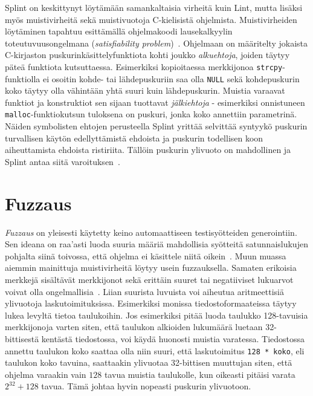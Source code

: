 Splint on keskittynyt löytämään samankaltaisia virheitä kuin Lint,
mutta lisäksi myös muistivirheitä sekä muistivuotoja C-kielisistä ohjelmista.
Muistivirheiden löytäminen tapahtuu esittämällä ohjelmakoodi lausekalkyylin toteutuvuusongelmana
(\emph{satisfiability problem})~\cite{SplintLCLint}.
Ohjelmaan on määritelty jokaista C-kirjaston puskurinkäsittelyfunktiota kohti joukko
\emph{alkuehtoja}, joiden täytyy päteä funktiota kutsuttaessa.
Esimerkiksi kopioitaessa merkkijonoa \texttt{strcpy}-funktiolla ei osoitin kohde- tai lähdepuskuriin
saa olla \texttt{NULL} sekä kohdepuskurin koko täytyy olla vähintään yhtä suuri kuin lähdepuskurin.
Muistia varaavat funktiot ja konstruktiot sen sijaan tuottavat \emph{jälkiehtoja} -
esimerkiksi onnistuneen \texttt{malloc}-funktiokutsun tuloksena on puskuri, jonka
koko annettiin parametrinä.
Näiden symbolisten ehtojen perusteella Splint yrittää selvittää syntyykö
puskurin turvallisen käytön edellyttämistä ehdoista ja
puskurin todellisen koon aiheuttamista ehdoista ristiriita.
Tällöin puskurin ylivuoto on mahdollinen ja Splint antaa siitä varoituksen~\cite{SplintLCLint}.

\section{Fuzzaus}
\label{Fuzzaus}

\emph{Fuzzaus} on yleisesti käytetty keino automaattiseen testisyötteiden generointiin.
Sen ideana on raa'asti luoda suuria määriä mahdollisia syötteitä satunnaislukujen pohjalta siinä toivossa,
että ohjelma ei käsittele niitä oikein~\cite{UnixReliability}.
Muun muassa aiemmin mainittuja muistivirheitä löytyy usein fuzzauksella.
Samaten erikoisia merkkejä sisältävät merkkijonot sekä erittäin suuret tai negatiiviset lukuarvot
voivat olla ongelmallisia~\cite{ViolatingAssumptions}.
Liian suurista luvuista voi aiheutua aritmeettisiä ylivuotoja laskutoimituksissa.
Esimerkiksi monissa tiedostoformaateissa täytyy lukea levyltä tietoa taulukoihin.
Jos esimerkiksi pitää luoda taulukko 128-tavuisia merkkijonoja varten siten,
että taulukon alkioiden lukumäärä luetaan 32-bittisestä kentästä tiedostossa,
voi käydä huonosti muistia varatessa.
Tiedostossa annettu taulukon koko saattaa olla niin suuri,
että laskutoimitus \texttt{128 * koko}, eli taulukon koko tavuina,
saattaakin ylivuotaa 32-bittisen muuttujan siten,
että ohjelma varaakin vain $128$ tavua muistia taulukolle,
kun oikeasti pitäisi varata $2^{32} + 128$ tavua.
Tämä johtaa hyvin nopeasti puskurin ylivuotoon.

